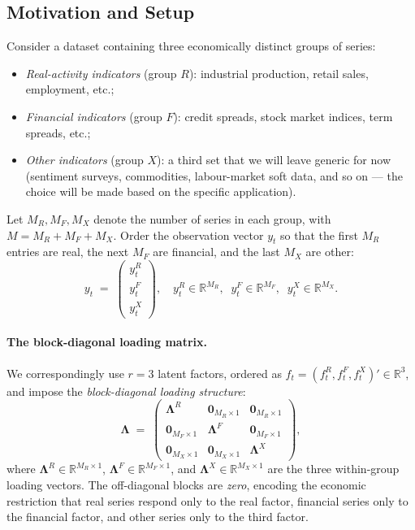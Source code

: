 \documentclass[11pt, a4paper, oneside]{article}
\newcommand{\mL}{\boldsymbol{\Lambda}}
\begin{document}
\subsection{Motivation and Setup}
\label{subsec:block-motivation}

Consider a dataset containing three economically distinct groups of
series:
\begin{itemize}[leftmargin=1.5em, itemsep=3pt]
    \item \emph{Real-activity indicators} (group $R$):
          industrial production, retail sales, employment, etc.;
    \item \emph{Financial indicators} (group $F$): credit spreads,
          stock market indices, term spreads, etc.;
    \item \emph{Other indicators} (group $X$): a third set that we
          will leave generic for now (sentiment surveys, commodities,
          labour-market soft data, and so on — the choice will be
          made based on the specific application).
\end{itemize}
Let $M_R, M_F, M_X$ denote the number of series in each group, with
$M = M_R + M_F + M_X$. Order the observation vector $y_t$ so that the
first $M_R$ entries are real, the next $M_F$ are financial, and the
last $M_X$ are other:
\[
y_t \;=\; \begin{pmatrix} y^R_t \\ y^F_t \\ y^X_t \end{pmatrix}, \quad
y^R_t \in \mathbb{R}^{M_R}, \;\; y^F_t \in \mathbb{R}^{M_F}, \;\; y^X_t \in \mathbb{R}^{M_X}.
\]

\paragraph{The block-diagonal loading matrix.}
We correspondingly use $r = 3$ latent factors, ordered as
$f_t = (f^R_t, f^F_t, f^X_t)' \in \mathbb{R}^3$, and impose the
\emph{block-diagonal loading structure}:
\begin{equation}
\mL \;=\; \begin{pmatrix}
\mL^R & \mathbf{0}_{M_R \times 1} & \mathbf{0}_{M_R \times 1} \\
\mathbf{0}_{M_F \times 1} & \mL^F & \mathbf{0}_{M_F \times 1} \\
\mathbf{0}_{M_X \times 1} & \mathbf{0}_{M_X \times 1} & \mL^X
\end{pmatrix},
\label{eq:block-Lambda}
\end{equation}
where $\mL^R \in \mathbb{R}^{M_R \times 1}$,
$\mL^F \in \mathbb{R}^{M_F \times 1}$, and
$\mL^X \in \mathbb{R}^{M_X \times 1}$ are the three
within-group loading vectors. The off-diagonal blocks are \emph{zero},
encoding the economic restriction that real series respond only to
the real factor, financial series only to the financial factor, and
other series only to the third factor.
\end{document}
